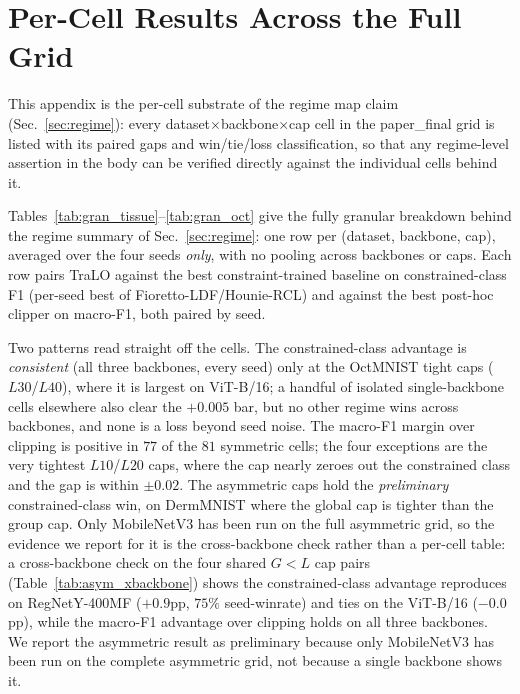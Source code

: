 \documentclass[10pt]{article}
\begin{document}
\section{Per-Cell Results Across the Full Grid}
\label{app:regime}

This appendix is the per-cell substrate of the regime map claim
(Sec.~\ref{sec:regime}): every dataset$\times$backbone$\times$cap cell in
the paper\_final grid is listed with its paired gaps and win/tie/loss
classification, so that any regime-level assertion in the body can be
verified directly against the individual cells behind it.

Tables~\ref{tab:gran_tissue}--\ref{tab:gran_oct} give the fully granular
breakdown behind the regime summary of Sec.~\ref{sec:regime}: one row
per (dataset, backbone, cap), averaged over the four seeds \emph{only},
with no pooling across backbones or caps. Each row pairs TraLO against
the best constraint-trained baseline on constrained-class F1 (per-seed
best of Fioretto-LDF/Hounie-RCL) and against the best post-hoc clipper
on macro-F1, both paired by seed.

Two patterns read straight off the cells. The constrained-class
advantage is \emph{consistent} (all three backbones, every seed) only
at the OctMNIST tight caps ($L30$/$L40$), where it is largest on
ViT-B/16; a handful of isolated single-backbone cells elsewhere also
clear the $+0.005$ bar, but no other regime wins across backbones, and
none is a loss beyond seed noise. The macro-F1 margin over clipping is
positive in $77$ of the $81$ symmetric cells; the four exceptions are
the very tightest $L10$/$L20$ caps, where the cap nearly zeroes out the
constrained class and the gap is within $\pm0.02$. The asymmetric caps
 hold the \emph{preliminary}
constrained-class win, on DermMNIST where the global cap is tighter
than the group cap. {Only MobileNetV3 has been
run on the full asymmetric grid, so the evidence we report for it is the
cross-backbone check rather than a per-cell table: a} cross-backbone check on the
four shared $G{<}L$ cap pairs (Table~\ref{tab:asym_xbackbone}) shows
the constrained-class advantage reproduces on RegNet{Y-400MF} ($+0.9$pp, $75\%$
seed-winrate) and ties on the ViT{-B/16} ($-0.0$pp), while the macro-F1
advantage over clipping holds on all three backbones. We report the
asymmetric result as preliminary because only MobileNetV3 has been run
on the complete asymmetric grid, not because a single backbone shows it.
\end{document}
